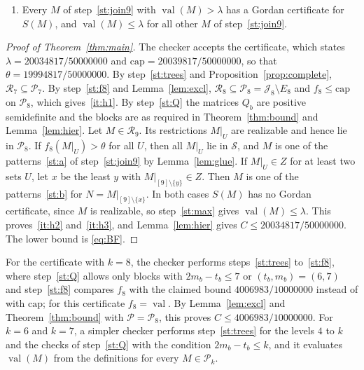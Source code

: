 \documentclass[11pt]{amsart}
\theoremstyle{definition}
\theoremstyle{remark}
\numberwithin{equation}{section}
\newcommand{\cR}{\mathcal{R}}
\newcommand{\cP}{\mathcal{P}}
\newcommand{\cJ}{\mathcal{J}}
\newcommand{\val}{\operatorname{val}}
\newcommand{\capv}{\mathrm{cap}}
\newcommand{\cS}{\mathcal{S}}
\newcommand{\BOUNDF}{20034817/50000000}
\newcommand{\CAPF}{20039817/50000000}
\newcommand{\THRF}{19994817/50000000}
\newcommand{\BOUNDEIGHTF}{4006983/10000000}
\begin{document}
\begin{enumerate}[label=(\roman*)]
\begin{enumerate}[label=(\alph*)]
\end{enumerate}
For~\ref{st:b}, Lemma~\ref{lem:glue}(a) gives the restriction of $M|_{[9]\setminus\{y\}}$ to the points $[9]\setminus\{x,y\}$ for each $y\ne x$, which restricts the candidates for $M|_{[9]\setminus\{y\}}$ to the patterns of $\cJ_8$ with one given restriction to $7$ points. The values $\val(M)$ of the patterns of~\ref{st:a} and~\ref{st:b} are computed by \eqref{eq:val9}, with $f_8$ from step~\ref{st:f8}.
\item\label{st:max} Every $M$ of step~\ref{st:join9} with $\val(M)>\lambda$ has a Gordan certificate for $S(M)$, and $\val(M)\le\lambda$ for all other $M$ of step~\ref{st:join9}.
\end{enumerate}

\begin{proof}[Proof of Theorem~\ref{thm:main}]
The checker accepts the certificate, which states $\lambda=\BOUNDF$ and $\capv=\CAPF$, so that $\theta=\THRF$. By step~\ref{st:trees} and Proposition~\ref{prop:complete}, $\cR_7\subseteq\cP_7$. By step~\ref{st:f8} and Lemma~\ref{lem:excl}, $\cR_8\subseteq\cP_8=\cJ_8\setminus E_8$ and $f_8\le\capv$ on $\cP_8$, which gives~\ref{it:h1}. By step~\ref{st:Q} the matrices $Q_b$ are positive semidefinite and the blocks are as required in Theorem~\ref{thm:bound} and Lemma~\ref{lem:hier}. Let $M\in\cR_9$. Its restrictions $M|_U$ are realizable and hence lie in $\cP_8$. If $f_8(M|_U)>\theta$ for all $U$, then all $M|_U$ lie in $\cS$, and $M$ is one of the patterns~\ref{st:a} of step~\ref{st:join9} by Lemma~\ref{lem:glue}. If $M|_U\in Z$ for at least two sets $U$, let $x$ be the least $y$ with $M|_{[9]\setminus\{y\}}\in Z$. Then $M$ is one of the patterns~\ref{st:b} for $N=M|_{[9]\setminus\{x\}}$. In both cases $S(M)$ has no Gordan certificate, since $M$ is realizable, so step~\ref{st:max} gives $\val(M)\le\lambda$. This proves~\ref{it:h2} and~\ref{it:h3}, and Lemma~\ref{lem:hier} gives $C\le\BOUNDF$. The lower bound is \eqref{eq:BF}.
\end{proof}


For the certificate with $k=8$, the checker performs steps~\ref{st:trees} to~\ref{st:f8}, where step~\ref{st:Q} allows only blocks with $2m_b-t_b\le7$ or $(t_b,m_b)=(6,7)$ and step~\ref{st:f8} compares $f_8$ with the claimed bound $\BOUNDEIGHTF$ instead of with $\capv$; for this certificate $f_8=\val$. By Lemma~\ref{lem:excl} and Theorem~\ref{thm:bound} with $\cP=\cP_8$, this proves $C\le\BOUNDEIGHTF$. For $k=6$ and $k=7$, a simpler checker performs step~\ref{st:trees} for the levels $4$ to $k$ and the checks of step~\ref{st:Q} with the condition $2m_b-t_b\le k$, and it evaluates $\val(M)$ from the definitions for every $M\in\cP_k$.
\end{document}
